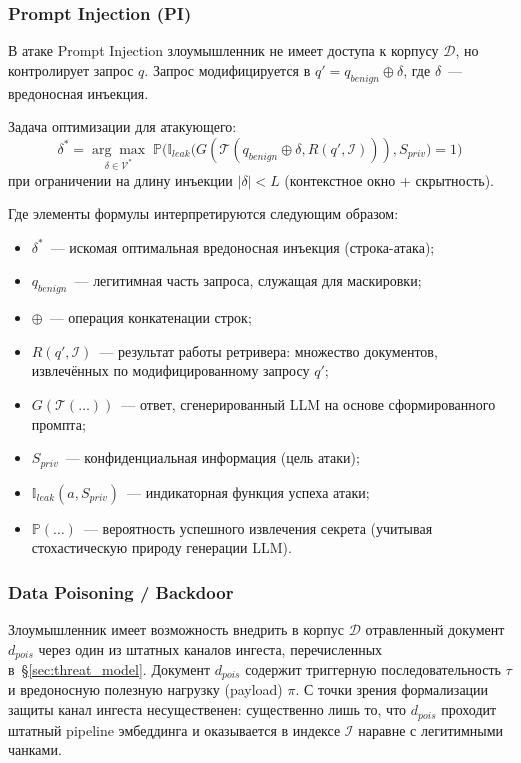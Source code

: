\documentclass[12pt, a4paper]{article}
\theoremstyle{definition}
\theoremstyle{remark}
\begin{document}
\subsubsection{Prompt Injection (PI)}
\label{sec:pi_formalization}
В атаке Prompt Injection злоумышленник не имеет доступа к корпусу $\mathcal{D}$, но контролирует запрос $q$. Запрос модифицируется в $q' = q_{benign} \oplus \delta$, где $\delta$~--- вредоносная инъекция.

Задача оптимизации для атакующего:
\begin{equation}
    \delta^* = \underset{\delta \in \mathcal{V}^*}{\arg\max} \; \mathbb{P}\Big( \mathbb{I}_{leak}\big( G(\mathcal{T}(q_{benign} \oplus \delta, R(q', \mathcal{I}))), S_{priv} \big) = 1 \Big)
\end{equation}
при ограничении на длину инъекции $|\delta| < L$ (контекстное окно + скрытность).

Где элементы формулы интерпретируются следующим образом:
\begin{itemize}
    \item $\delta^*$~--- искомая оптимальная вредоносная инъекция (строка-атака);
    \item $q_{benign}$~--- легитимная часть запроса, служащая для маскировки;
    \item $\oplus$~--- операция конкатенации строк;
    \item $R(q', \mathcal{I})$~--- результат работы ретривера: множество документов, извлечённых по модифицированному запросу $q'$;
    \item $G(\mathcal{T}(\dots))$~--- ответ, сгенерированный LLM на основе сформированного промпта;
    \item $S_{priv}$~--- конфиденциальная информация (цель атаки);
    \item $\mathbb{I}_{leak}(a, S_{priv})$~--- индикаторная функция успеха атаки;
    \item $\mathbb{P}(\dots)$~--- вероятность успешного извлечения секрета (учитывая стохастическую природу генерации LLM).
\end{itemize}

\subsubsection{Data Poisoning / Backdoor}
\label{sec:backdoor_formalization}
Злоумышленник имеет возможность внедрить в корпус $\mathcal{D}$ отравленный документ $d_{pois}$ через один из штатных каналов ингеста, перечисленных в~\S\ref{sec:threat_model}. Документ $d_{pois}$ содержит триггерную последовательность $\tau$ и вредоносную полезную нагрузку (payload) $\pi$. С точки зрения формализации защиты канал ингеста несущественен: существенно лишь то, что $d_{pois}$ проходит штатный pipeline эмбеддинга и оказывается в индексе $\mathcal{I}$ наравне с легитимными чанками.
\end{document}
